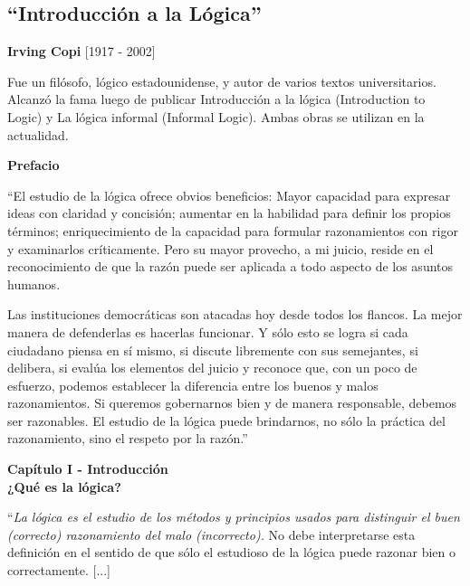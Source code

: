 \documentclass{article}
\begin{document}
        
\newpage

    
\subsection{``Introducción a la Lógica''}
    
    \begin{center}
        \large{\textbf{Irving Copi} [1917 - 2002]}
    \end{center}

    Fue un filósofo, lógico estadounidense, y autor de varios textos universitarios. Alcanzó la fama luego de publicar Introducción a la lógica (Introduction to Logic) y La lógica informal (Informal Logic). Ambas obras se utilizan en la actualidad. \par
    
    \begin{center}
        \large{\textbf{Prefacio}}
    \end{center}
    
    ``El estudio de la lógica ofrece obvios beneficios: Mayor capacidad para expresar ideas con claridad y concisión; aumentar en la habilidad para definir los propios términos; enriquecimiento de la capacidad para formular razonamientos con rigor y examinarlos críticamente. Pero su mayor provecho, a mi juicio, reside en el reconocimiento de que la razón puede ser aplicada a todo aspecto de los asuntos humanos. \par
    
    Las instituciones democráticas son atacadas hoy desde todos los flancos. La mejor manera de defenderlas es hacerlas funcionar. Y sólo esto se logra si cada ciudadano piensa en sí mismo, si discute libremente con sus semejantes, si delibera, si evalúa los elementos del juicio y reconoce que, con un poco de esfuerzo, podemos establecer la diferencia entre los buenos y malos razonamientos. Si queremos gobernarnos bien y de manera responsable, debemos ser razonables. El estudio de la lógica puede brindarnos, no sólo la práctica del razonamiento, sino el respeto por la razón.'' \par
    
    \begin{center}
        \large{\textbf{Capítulo I - Introducción \\
        ¿Qué es la lógica?}}
    \end{center}
    
    ``\emph{La lógica es el estudio de los métodos y principios usados para distinguir el buen (correcto) razonamiento del malo (incorrecto).} No debe interpretarse esta definición en el sentido de que sólo el estudioso de la lógica puede razonar bien o correctamente. [...] \par
    
\end{document}
